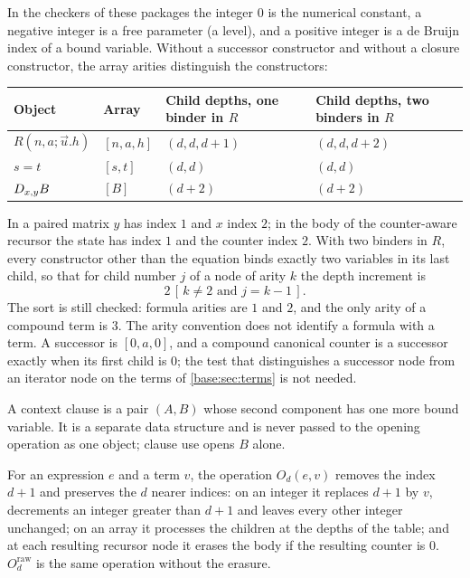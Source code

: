 In the checkers of these packages the integer $0$ is the numerical constant, a negative
integer is a free parameter (a level), and a positive integer is a de Bruijn index of a
bound variable. Without a successor constructor and without a closure constructor, the
array arities distinguish the constructors:
\begin{center}
\small
\begin{tabular}{@{}llll@{}}
\toprule
Object & Array & Child depths, one binder in $R$ & Child depths, two binders in $R$\\
\midrule
$R(n,a;\vec u.h)$ & $[n,a,h]$ & $(d,d,d+1)$ & $(d,d,d+2)$\\
$s=t$ & $[s,t]$ & $(d,d)$ & $(d,d)$\\
$D_{x,y}B$ & $[B]$ & $(d+2)$ & $(d+2)$\\
\bottomrule
\end{tabular}
\end{center}
In a paired matrix $y$ has index $1$ and $x$ index $2$; in the body of the counter-aware
recursor the state has index $1$ and the counter index $2$. With two binders in $R$, every
constructor other than the equation binds exactly two variables in its last child, so that
for child number $j$ of a node of arity $k$ the depth increment is
\begin{equation}\label{ctr:eq:uniform}
 2\,[\,k\neq 2 \text{ and } j=k-1\,].
\end{equation}
The sort is still checked: formula arities are $1$ and $2$, and the only arity of a
compound term is $3$. The arity convention does not identify a formula with a term. A
successor is $[0,a,0]$, and a compound canonical counter is a successor exactly when its
first child is $0$; the test that distinguishes a successor node from an iterator node on
the terms of \cref{base:sec:terms} is not needed.

A context clause is a pair $(A,B)$ whose second component has one more bound variable. It
is a separate data structure and is never passed to the opening operation as one object;
clause use opens $B$ alone.

\begin{definition}[Opening]
For an expression $e$ and a term $v$, the operation $O_d(e,v)$ removes the index $d+1$ and
preserves the $d$ nearer indices: on an integer it replaces $d+1$ by $v$, decrements an
integer greater than $d+1$ and leaves every other integer unchanged; on an array it
processes the children at the depths of the table; and at each resulting recursor node it
erases the body if the resulting counter is $0$. $O_d^{\mathrm{raw}}$ is the same operation
without the erasure.
\end{definition}

